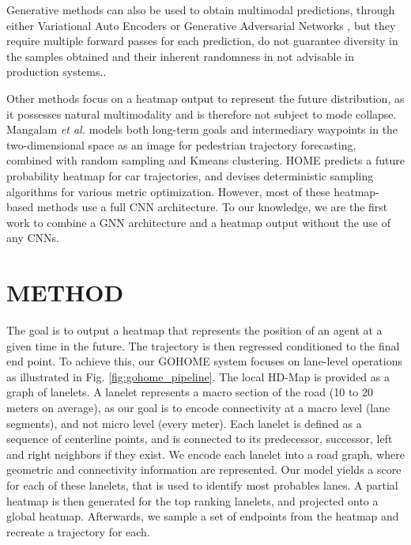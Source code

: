 \documentclass[letterpaper, 10 pt, conference]{ieeeconf}
\begin{document}
Generative methods can also be used to obtain multimodal predictions, through either Variational Auto Encoders \cite{lee2017desire, rhinehart2018r2p2, tang2019multiple, mangalam2020not} or Generative Adversarial Networks \cite{alahi2016social, sadeghian2019sophie}, but they require multiple forward passes for each prediction, do not guarantee diversity in the samples obtained and their inherent randomness in not advisable in production systems..



Other methods focus on a heatmap output to represent the future distribution, as it possesses natural multimodality and is therefore not subject to mode collapse. Mangalam \textit{et al.} \cite{mangalam2020goals} models both long-term goals and intermediary waypoints in the two-dimensional space as an image for pedestrian trajectory forecasting, combined with random sampling and Kmeans clustering. HOME \cite{gilles2021home} predicts a future probability heatmap for car trajectories, and devises deterministic sampling algorithms for various metric optimization.
However, most of these heatmap-based methods use a full CNN architecture. To our knowledge, we are the first work to combine a GNN architecture and a heatmap output without the use of any CNNs.




\section{METHOD}
\label{sec:method}

The goal is to output a heatmap that represents the position of an agent at a given time in the future. The trajectory is then regressed conditioned to the final end point.
To achieve this, our GOHOME system focuses on lane-level operations as illustrated in Fig. \ref{fig:gohome_pipeline}.
The local HD-Map is provided as a graph of  lanelets. A lanelet represents a macro section of the road (10 to 20 meters on average), as our goal is to encode connectivity at a macro level (lane segments), and not micro level (every meter). Each lanelet is defined as a sequence of centerline points, and is connected to its predecessor, successor, left and right neighbors if they exist. 
We encode each lanelet into a road graph, where geometric and connectivity information are represented. Our model yields a score for each of these lanelets, that is used to identify most probables lanes. A partial heatmap is then generated for the top ranking lanelets, and projected onto a global heatmap. Afterwards, we sample a set of endpoints from the heatmap and recreate a trajectory for each.
\end{document}
